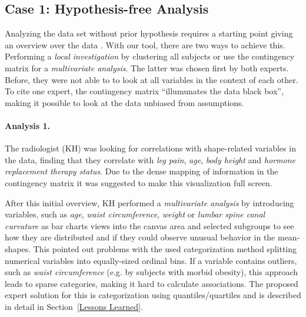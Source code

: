 \documentclass[journal]{style/vgtc} 			          %
\begin{document}
\subsection{Case 1: Hypothesis-free Analysis} \label{Hypothesis-free analysis}
Analyzing the data set without prior hypothesis requires a starting point giving an overview over the data \cite{Shneiderman1996}.
%
With our tool, there are two ways to achieve this.
%
Performing a \emph{local investigation} by clustering all subjects or use the contingency matrix for a \emph{multivariate analysis}.
%
The latter was chosen first by both experts.
%
Before, they were not able to to look at all variables in the context of each other.
%
%
To cite one expert, the contingency matrix ``illumunates the data black box'', making it possible to look at the data unbiased from assumptions.

\paragraph{Analysis 1.}
%
The radiologist (KH) was looking for correlations with shape-related variables in the data, finding that they correlate with \emph{leg pain}, \emph{age}, \emph{body height} and \emph{hormone replacement therapy status}.
%
Due to the dense mapping of information in the contingency matrix it was suggested to make this visualization full screen.

After this initial overview, KH performed a \emph{multivariate analysis} by introducing variables, such as \emph{age}, \emph{waist circumference}, \emph{weight} or \emph{lumbar spine canal curvature} as bar charts views into the canvas area and selected subgroups to see how they are distributed and if they could observe unusual behavior in the mean-shapes.
%
This pointed out problems with the used categorization method splitting numerical variables into equally-sized ordinal bins.
%
If a variable contains outliers, such as \emph{waist circumference} (e.g. by subjects with morbid obesity), this approach leads to sparse categories, making it hard to calculate associations.
%
The proposed expert solution for this is categorization using quantiles/quartiles and is described in detail in Section~\ref{Lessons Learned}.
\end{document}
